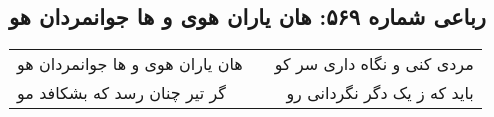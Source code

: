 \begin{center}
\section*{رباعی شماره ۵۶۹: هان یاران هوی و ها جوانمردان هو}
\label{sec:sh569}
\begin{longtable}{l p{0.5cm} r}
هان یاران هوی و ها جوانمردان هو
&&
مردی کنی و نگاه داری سر کو
\\
گر تیر چنان رسد که بشکافد مو
&&
باید که ز یک دگر نگردانی رو
\\
\end{longtable}
\end{center}
